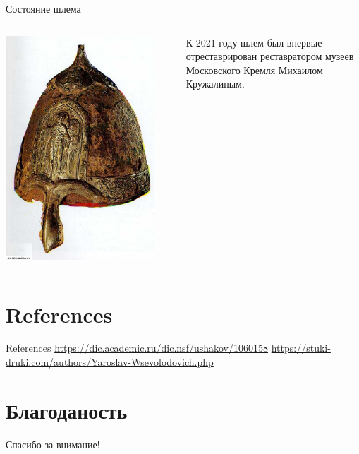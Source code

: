 \begin{frame}{Состояние шлема}
	\begin{columns}
		\begin{column}{0.45\textwidth}
			\includegraphics[width=0.9\textwidth]{shlem3.jpg}
		\end{column}
		\begin{column}{0.45\textwidth}

			К 2021 году шлем был впервые отреставрирован реставратором музеев Московского Кремля Михаилом Кружалиным.

		\end{column}
	\end{columns}
\end{frame}

\section{References}

\begin{frame}[t]{References}
	\printbibliography
	\url{https://dic.academic.ru/dic.nsf/ushakov/1060158}
	\url{https://stuki-druki.com/authors/Yaroslav-Wsevolodovich.php}
\end{frame}

\section{Благоданость}
\begin{frame}
	\centering
	\huge
	Спасибо за внимание!
\end{frame}


